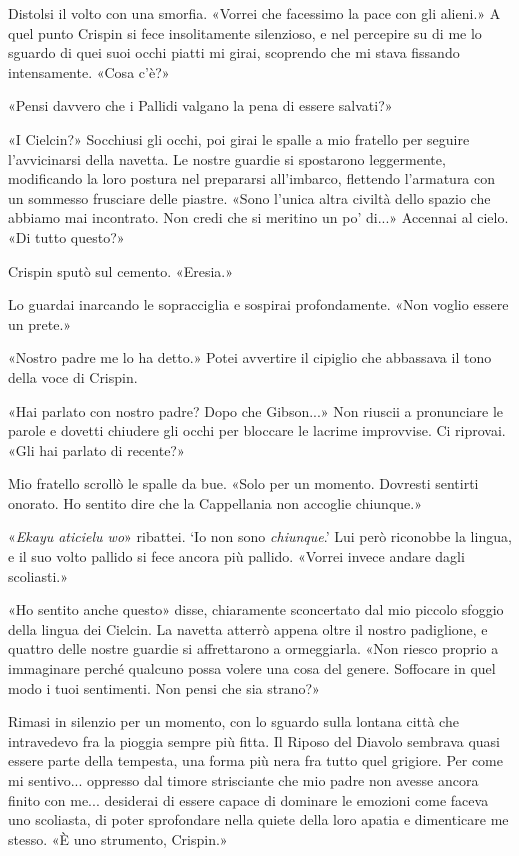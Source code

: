 Distolsi il volto con una smorfia. «Vorrei che facessimo la pace con gli
alieni.» A quel punto Crispin si fece insolitamente silenzioso, e nel
percepire su di me lo sguardo di quei suoi occhi piatti mi girai,
scoprendo che mi stava fissando intensamente. «Cosa c'è?»

«Pensi davvero che i Pallidi valgano la pena di essere salvati?»

«I Cielcin?» Socchiusi gli occhi, poi girai le spalle a mio fratello per
seguire l'avvicinarsi della navetta. Le nostre guardie si spostarono
leggermente, modificando la loro postura nel prepararsi all'imbarco,
flettendo l'armatura con un sommesso frusciare delle piastre. «Sono
l'unica altra civiltà dello spazio che abbiamo mai incontrato. Non credi
che si meritino un po' di...» Accennai al cielo. «Di tutto questo?»

Crispin sputò sul cemento. «Eresia.»

Lo guardai inarcando le sopracciglia e sospirai profondamente. «Non
voglio essere un prete.»

«Nostro padre me lo ha detto.» Potei avvertire il cipiglio che abbassava
il tono della voce di Crispin.

«Hai parlato con nostro padre? Dopo che Gibson...» Non riuscii a
pronunciare le parole e dovetti chiudere gli occhi per bloccare le
lacrime improvvise. Ci riprovai. «Gli hai parlato di recente?»

Mio fratello scrollò le spalle da bue. «Solo per un momento. Dovresti
sentirti onorato. Ho sentito dire che la Cappellania non accoglie
chiunque.»

«\emph{Ekayu aticielu wo}» ribattei. `Io non sono \emph{chiunque}.' Lui
però riconobbe la lingua, e il suo volto pallido si fece ancora più
pallido. «Vorrei invece andare dagli scoliasti.»

«Ho sentito anche questo» disse, chiaramente sconcertato dal mio piccolo
sfoggio della lingua dei Cielcin. La navetta atterrò appena oltre il
nostro padiglione, e quattro delle nostre guardie si affrettarono a
ormeggiarla. «Non riesco proprio a immaginare perché qualcuno possa
volere una cosa del genere. Soffocare in quel modo i tuoi sentimenti.
Non pensi che sia strano?»

Rimasi in silenzio per un momento, con lo sguardo sulla lontana città
che intravedevo fra la pioggia sempre più fitta. Il Riposo del Diavolo
sembrava quasi essere parte della tempesta, una forma più nera fra tutto
quel grigiore. Per come mi sentivo... oppresso dal timore strisciante
che mio padre non avesse ancora finito con me... desiderai di essere
capace di dominare le emozioni come faceva uno scoliasta, di poter
sprofondare nella quiete della loro apatia e dimenticare me stesso. «È
uno strumento, Crispin.»

